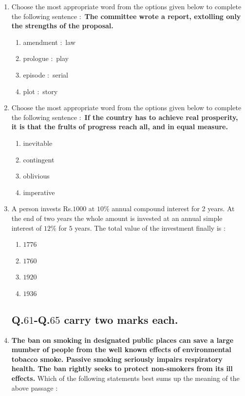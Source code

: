 \documentclass[journal,12pt,onecolumn]{IEEEtran}
\theoremstyle{remark}
\begin{document}
\begin{enumerate}
\item Choose the most appropriate word from the options given below to complete the following
sentence $\colon$
\textbf{The committee wrote a \underline{\hspace{1.5cm}} report, extolling only the strengths of the proposal.}


\hfill{}

\begin{enumerate}
\item amendment $\colon$ law
\item prologue $\colon$ play
\item episode $\colon$ serial
\item plot $\colon$ story
\end{enumerate}

\item Choose the most appropriate word from the options given below to complete the following
sentence $\colon$
\textbf{If the country has to achieve real prosperity, it is \underline{\hspace{1.5cm}} that the frults of progress reach all, and in equal measure.}


\hfill{}

\begin{enumerate}
\item inevitable
\item contingent
\item oblivious
\item imperative
\end{enumerate}

\item A person invests Rs.$1000$ at $10$\% annual compound interest for 2 years. At the end of two years the
whole amount is invested at an annual simple interest of $12$\% for $5$ years. The total value of the
investment finally is $\colon$


\hfill{}

\begin{multicols}{4}
\begin{enumerate}
\item $1776$
\item $1760$
\item $1920$
\item $1936$
\end{enumerate}
\end{multicols}


\subsection*{Q.$61$-Q.$65$ carry two marks each.}
\item \textbf{The ban on smoking in designated public places can save a large mumber of people from the
well known effects of environmental tobacco smoke. Passive smoking seriously impairs respiratory health. The ban rightly seeks to protect non-smokers from its ill effects.}
Which of the following statements best sums up the meaning of the above passage $\colon$



\end{enumerate}
\end{document}
